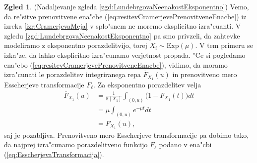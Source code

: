 \documentclass[12pt, a4paper, reqno]{amsart}
\theoremstyle{definition}
\newtheorem{zgled}[definicija]{Zgled}
\theoremstyle{plain}
\newcommand{\E}{\mathbb{E}}
\newcommand{\1}{\mathds{1}}
\begin{document}
            \begin{zgled}(Nadaljevanje zgleda \ref{zgd:LundebrgovaNeenakostEksponentno})
                Vemo, da re"sitve prenovitvene ena"cbe (\ref{eq:resitevCramerjevePrenovitveneEnacbe}) 
                iz izreka \ref{izr:CramerjevaMeja} v splo"snem ne moremo eksplicitno izra"cuanti.
                V zgledu \ref{zgd:LundebrgovaNeenakostEksponentno} pa smo privzeli, da zahtevke modeliramo 
                z eksponentno porazdelitvijo, torej $X_i\sim\text{Exp}(\mu)$. 
                V tem primeru se izka"ze, da lahko eksplicitno izra"cunamo verjetnost propada.
                "Ce si pogledamo ena"cbo (\ref{eq:resitevCramerjevePrenovitveneEnacbe}), vidimo, da moramo 
                izra"cunati le porazdelitev integriranega repa $\overline{F}_{X_1}(u)$ in 
                prenovitveno mero Esscherjeve transformacije $F_\ell$. Za eksponentno porazdelitev
                velja
                \begin{align*}
                    \overline{F}_{X_1}(u)   &= \frac{1}{\E\left[X_1\right]}\int_{(0, u)}\bigl(1 - F_{X_1}(t)\bigr)dt \\
                                            &= \mu\int_{(0, u)}e^{-\mu t}dt \\
                                            &= F_{X_1}(u),
                \end{align*}
                saj je pozabljiva. Prenovitveno mero Esscherjeve transformacije pa dobimo tako, 
                da najprej izra"cunamo porazdelitveno funkcijo $F_\ell$ podano v ena"cbi (\ref{eq:EsscherjevaTransformacija}). 


\end{zgled}
\end{document}
